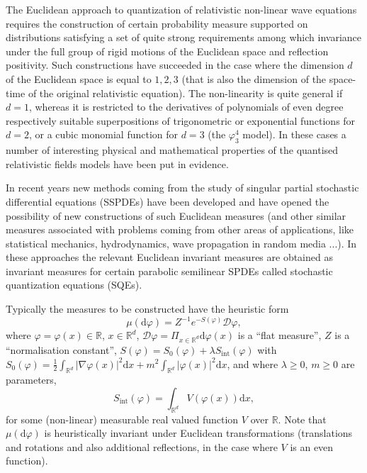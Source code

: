\documentclass[a4paper,10pt]{article}
\newcommand{\mathd}{\mathrm{d}}
\newcommand{\tmop}[1]{\ensuremath{\operatorname{#1}}}
\newcommand{\textdots}[0]{...}
\begin{document}
The Euclidean approach to quantization of relativistic non-linear wave
equations requires the construction of certain probability measure supported
on distributions satisfying a set of quite strong requirements among which
invariance under the full group of rigid motions of the Euclidean space and
reflection positivity. Such constructions have succeeded in the case where the
dimension $d$ of the Euclidean space is equal to $1, 2, 3$ (that is also the
dimension of the space-time of the original relativistic equation). The
non-linearity is quite general if $d = 1$, whereas it is restricted to the
derivatives of polynomials of even degree respectively suitable superpositions
of trigonometric or exponential functions for $d = 2$, or a cubic monomial
function for $d = 3$ (the $\varphi^4_3$ model). In these cases a number of
interesting physical and mathematical properties of the quantised relativistic
fields models have been put in evidence.

In recent years new methods coming from the study of singular partial
stochastic differential equations (SSPDEs) have been developed and have opened
the possibility of new constructions of such Euclidean measures (and other
similar measures associated with problems coming from other areas of
applications, like statistical mechanics, hydrodynamics, wave propagation in
random media {\textdots}). In these approaches the relevant Euclidean
invariant measures are obtained as invariant measures for certain parabolic
semilinear SPDEs called stochastic quantization equations (SQEs).

Typically the measures to be constructed have the heuristic form
\[ \mu (\mathd \varphi) = Z^{- 1} e^{- S (\varphi)} \mathcal{D} \varphi, \]
where $\varphi = \varphi (x) \in \mathbb{R}$, $x \in \mathbb{R}^d$,
$\mathcal{D} \varphi = \Pi_{x \in \mathbb{R}^d} \mathd \varphi (x)$ is a
``flat measure'', $Z$ is a ``normalisation constant'', $S (\varphi) = S_0
(\varphi) + \lambda S_{\tmop{int}} (\varphi)$ with $S_0 (\varphi) =
\frac{1}{2} \int_{\mathbb{R}^d} | \nabla \varphi (x) |^2 \mathd x + m^2
\int_{\mathbb{R}^d} | \varphi (x) |^2 \mathd x$, and where $\lambda \geqslant
0$, $m \geqslant 0$ are parameters,
\[ S_{\tmop{int}} (\varphi) = \int_{\mathbb{R}^d} V (\varphi (x)) \mathd x, \]
for some (non-linear) measurable real valued function $V$ over $\mathbb{R}$.
Note that $\mu (\mathd \varphi)$ is heuristically invariant under Euclidean
transformations (translations and rotations and also additional reflections,
in the case where $V$ is an even function).
\end{document}
